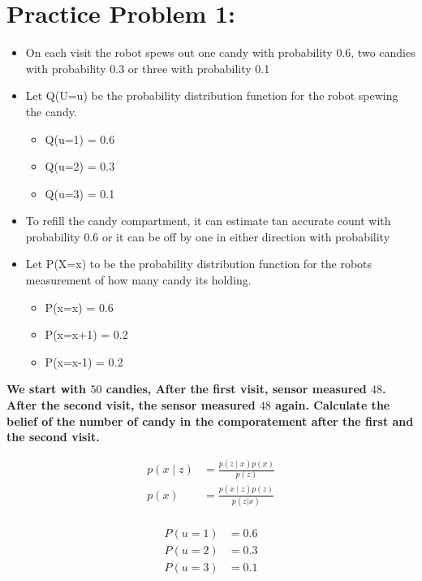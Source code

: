 \documentclass[14pt,letterpaper]{article}
\theoremstyle{definition}
\begin{document}
\section{Practice Problem 1:}
\begin{itemize}
  \item On each visit the robot spews out one candy with probability $0.6$, two candies with probability 0.3 or three with probability 0.1
  \item Let Q(U=u) be the probability distribution function for the robot spewing the candy.
  \begin{itemize}
    \item Q(u=1) = 0.6
    \item Q(u=2) = 0.3
    \item Q(u=3) = 0.1
  \end{itemize}
  \item To refill the candy compartment, it can estimate tan accurate count with probability 0.6 or it can be off by one in either direction with probability
  \item Let P(X=x) to be the probability distribution function for the robots measurement of how many candy its holding.
  \begin{itemize}
    \item P(x=x) = 0.6
    \item P(x=x+1) = 0.2
    \item P(x=x-1) = 0.2
  \end{itemize}
\end{itemize}

\textbf{We start with $50$ candies, After the first visit, sensor measured $48$.
After the second visit, the sensor measured $48$ again. Calculate the belief of the number of candy in the comporatement after the first and the second visit.
}

\begin{align}
  p(x \mid z) &= \frac{p(z \mid x)p(x)}{p(z)} \\
  p(x) &= \frac{p(x \mid z)p(z)}{p(z | x)} \\
  \label{eq:Bayes Rule}
\end{align}

\begin{align}
  P(u = 1) &= 0.6 \\
  P(u = 2) &= 0.3 \\
  P(u = 3) &= 0.1 \\
  \label{eq: Action Probability Distributions}
\end{align}
\end{document}
